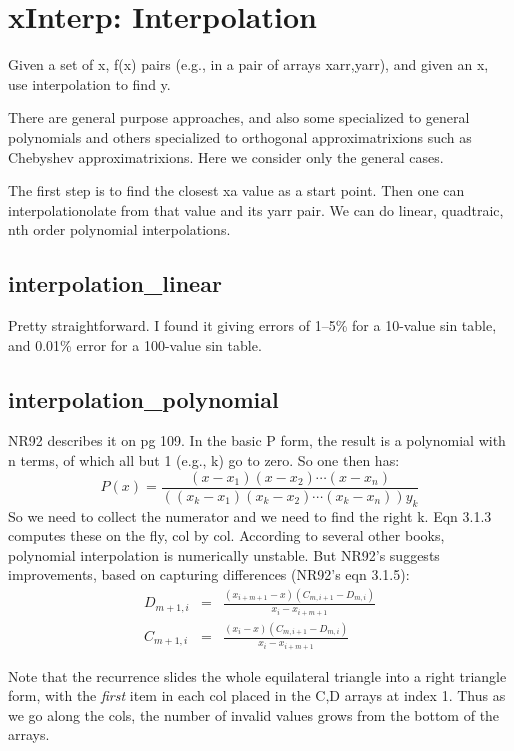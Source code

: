 \section{xInterp: Interpolation}
Given a set of x, f(x) pairs (e.g., in a pair of arrays
xarr,yarr), and given an x, use interpolation to find y.

There are general purpose approaches, and also some
specialized to general polynomials and others specialized to 
orthogonal approximatrixions
such as Chebyshev approximatrixions.  Here we consider only the
general cases.

The first step is to find the closest xa value as a start
point.  Then one can interpolationolate from that value and its
yarr pair.  We can do linear, quadtraic, nth order
polynomial interpolations.

\subsection*{interpolation\_linear}
Pretty straightforward.  I found it giving errors of 1--5\%
for a 10-value sin table, and 0.01\% error for a 100-value
sin table.

\subsection*{interpolation\_polynomial}
NR92 describes it on pg 109.  In the basic P form, the
result is a polynomial with n terms, of which all but 1
(e.g., k) go to zero.  So one then has:
\begin{equation}
     P(x)=\frac{(x-x_1)(x-x_2) \cdots (x-x_n)}
                 {((x_k-x_1)(x_k-x_2) \cdots (x_k-x_n))y_k}
\end{equation}
So we need to collect the numerator and we need to find the
right k.  Eqn 3.1.3 computes these on the fly, col by col.
According to several other books, polynomial interpolation
is numerically unstable.  But NR92's suggests improvements, based on
capturing differences (NR92's eqn 3.1.5):
\begin{eqnarray}
  D_{m+1,i} & = & \frac{(x_{i+m+1}-x)(C_{m,i+1}-D_{m,i})}{x_i-x_{i+m+1}}\\
  C_{m+1,i} & = & \frac{(x_{i}    -x)(C_{m,i+1}-D_{m,i})}{x_i-x_{i+m+1}}
\end{eqnarray}


Note that the recurrence
slides the whole equilateral triangle into a right triangle
form, with the {\em first} item in each col placed in the C,D
arrays at index 1.  Thus as we go along the cols, the number
of invalid values grows from the bottom of the arrays.

